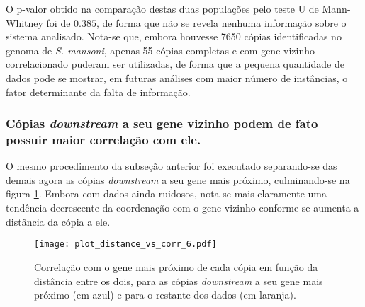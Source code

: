 \documentclass[12pt]{article}
\begin{document}
\begin{multicols}{2}
O p-valor obtido na comparação destas duas populações pelo teste U de Mann-Whitney foi de \(0.385\), de forma que não se revela nenhuma informação sobre o sistema analisado. Nota-se que, embora houvesse 7650 cópias identificadas no genoma de \textit{S. mansoni}, apenas 55 cópias completas e com gene vizinho correlacionado puderam ser utilizadas, de forma que a pequena quantidade de dados pode se mostrar, em futuras análises com maior número de instâncias, o fator determinante da falta de informação.

% 


\subsubsection{Cópias \textit{downstream} a seu gene vizinho podem de fato possuir maior correlação com ele.}
O mesmo procedimento da subseção anterior foi executado separando-se das demais agora as cópias \textit{downstream} a seu gene mais próximo, culminando-se na figura \ref{updownstream}. Embora com dados ainda ruidosos, nota-se mais claramente uma tendência decrescente da coordenação com o gene vizinho conforme se aumenta a distância da cópia a ele.

\begin{figure}[H]
	\centering
	\label{updownstream}
	\texttt{[image: plot\_distance\_vs\_corr\_6.pdf]}
	\caption{Correlação com o gene mais próximo de cada cópia em função da distância entre os dois, para as cópias \textit{downstream} a seu gene mais próximo (em azul) e para o restante dos dados (em laranja).}
\end{figure}


\end{multicols}
\end{document}
